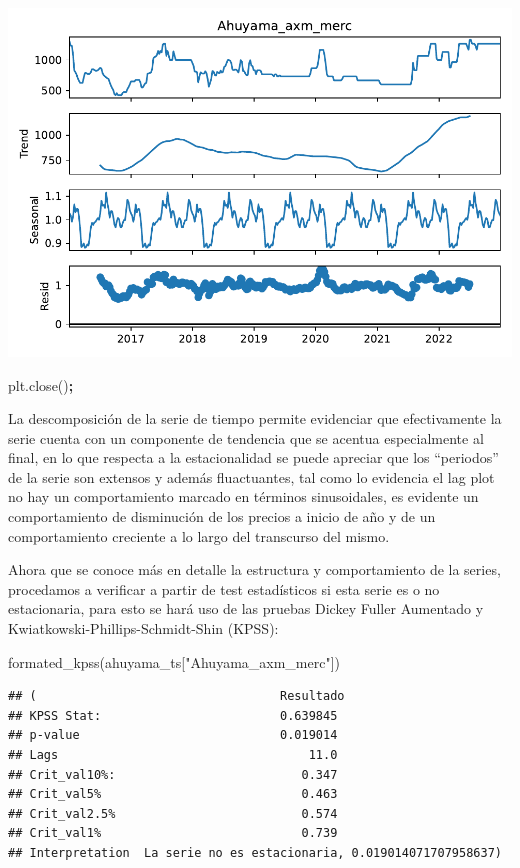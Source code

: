 \documentclass[
]{book}
\newenvironment{Shaded}{\begin{snugshade}}{\end{snugshade}}
\newcommand{\NormalTok}[1]{#1}
\newcommand{\OperatorTok}[1]{\textcolor[rgb]{0.81,0.36,0.00}{\textbf{#1}}}
\newcommand{\StringTok}[1]{\textcolor[rgb]{0.31,0.60,0.02}{#1}}
\begin{document}
\includegraphics{bookdown-demo_files/figure-latex/unnamed-chunk-48-7.pdf}

\begin{Shaded}
\begin{Highlighting}[]
\NormalTok{plt.close()}\OperatorTok{;}
\end{Highlighting}
\end{Shaded}

La descomposición de la serie de tiempo permite evidenciar que efectivamente la serie cuenta con un componente de tendencia que se acentua especialmente al final, en lo que respecta a la estacionalidad se puede apreciar que los ``periodos'' de la serie son extensos y además fluactuantes, tal como lo evidencia el lag plot no hay un comportamiento marcado en términos sinusoidales, es evidente un comportamiento de disminución de los precios a inicio de año y de un comportamiento creciente a lo largo del transcurso del mismo.

Ahora que se conoce más en detalle la estructura y comportamiento de la series, procedamos a verificar a partir de test estadísticos si esta serie es o no estacionaria, para esto se hará uso de las pruebas Dickey Fuller Aumentado y Kwiatkowski-Phillips-Schmidt-Shin (KPSS):

\begin{Shaded}
\begin{Highlighting}[]

\NormalTok{formated\_kpss(ahuyama\_ts[}\StringTok{"Ahuyama\_axm\_merc"}\NormalTok{])}
\end{Highlighting}
\end{Shaded}

\begin{verbatim}
## (                                  Resultado
## KPSS Stat:                         0.639845
## p-value                            0.019014
## Lags                                   11.0
## Crit_val10%:                          0.347
## Crit_val5%                            0.463
## Crit_val2.5%                          0.574
## Crit_val1%                            0.739
## Interpretation  La serie no es estacionaria, 0.019014071707958637)
\end{verbatim}
\end{document}
